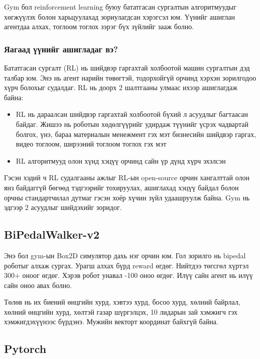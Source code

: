 \documentclass[12pt,A4]{report}
\begin{document}
Gym бол reinforcement learning буюу бататгасан сургалтын алгоритмуудыг хөгжүүлэх болон харьцуулахад зориулагдсан хэрэгсэл юм. Үүнийг ашиглан агентдаа алхах, тоглоом тоглох зэрэг бүх зүйлийг зааж болно. 

\subsubsection{Яагаад үүнийг ашигладаг вэ?}

Бататгасан сургалт (RL) нь шийдвэр гаргахтай холбоотой машин сургалтын дэд талбар юм. Энэ нь агент нарийн төвөгтэй, тодорхойгүй орчинд хэрхэн зорилгодоо хүрч болохыг судалдаг. RL нь доорх 2 шалтгааны улмаас ихээр ашиглагдаж байна:

\begin{itemize}
	\item RL нь дараалсан шийдвэр гаргахтай холбоотой бүхий л асуудлыг багтаасан байдаг. Жишээ нь роботын хөдөлгүүрийг удирдаж түүнийг үсрэх чадвартай болгох, үнэ, бараа материалын менежмент гэх мэт бизнесийн шийдвэр гаргах, видео тоглоом, ширээний тоглоом тоглох гэх мэт
	\item RL алгоритмууд олон хүнд хэцүү орчинд сайн үр дүнд хүрч эхэлсэн
\end{itemize} 

Гэсэн хэдий ч RL судалгааны ажлыг RL-ын open-source орчин хангалттай олон янз байдаггүй бөгөөд тэдгээрийг тохируулах, ашиглахад хэцүү байдал болон орчны стандартчилал дутмаг гэсэн хоёр хүчин зүйл удаашруулж байна. Gym нь эдгээр 2 асуудлыг шийдэхийг зоридог.

\subsection{BiPedalWalker-v2}

Энэ бол gym-ын Box2D симулятор дахь нэг орчин юм. Гол зорилго нь bipedal роботыг алхаж сургах. Урагш алхах бүрд reward өгдөг. Нийтдээ төгсгөл хүртэл 300+ оноог өгдөг. Хэрэв робот унавал -100 оноо өгдөг. Илүү сайн агент нь илүү сайн оноо авах болно. 

Төлөв нь их биений өнцгийн хурд, хэвтээ хурд, босоо хурд, хөлний байрлал, хөлний өнцгийн хурд, хөлтэй газар шүргэлцэх, 10 лидарын зай хэмжигч гэх хэмжигдэхүүнээс бүрдэнэ. Мужийн векторт координат байхгүй байна.

\subsection{Pytorch}
\end{document}
